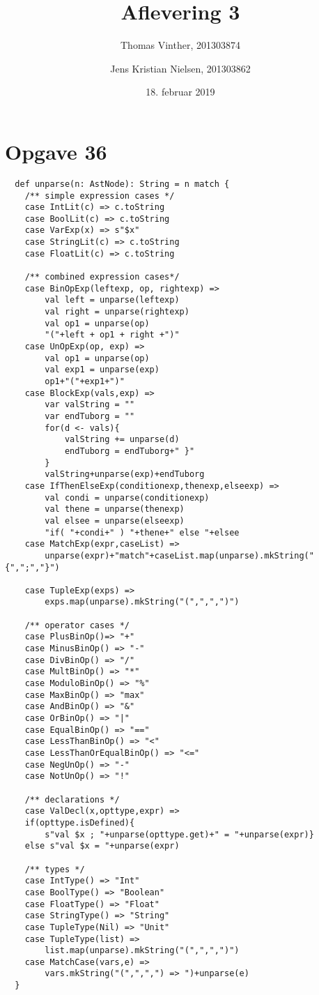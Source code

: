\documentclass[a4paper, 10pt]{article}
\title{Aflevering 3}
\author{Thomas Vinther, 201303874 \and Jens Kristian Nielsen, 201303862}
\date{18. februar 2019}
\begin{document}
\maketitle
\section*{Opgave 36}
\begin{lstlisting}
  def unparse(n: AstNode): String = n match {
  	/** simple expression cases */
  	case IntLit(c) => c.toString
  	case BoolLit(c) => c.toString
  	case VarExp(x) => s"$x"
  	case StringLit(c) => c.toString
  	case FloatLit(c) => c.toString
  	
  	/** combined expression cases*/
  	case BinOpExp(leftexp, op, rightexp) =>
  		val left = unparse(leftexp)
  		val right = unparse(rightexp)
  		val op1 = unparse(op)
  		"("+left + op1 + right +")"
  	case UnOpExp(op, exp) =>
  		val op1 = unparse(op)
  		val exp1 = unparse(exp)
  		op1+"("+exp1+")"
  	case BlockExp(vals,exp) =>
  		var valString = ""
  		var endTuborg = ""
  		for(d <- vals){
  			valString += unparse(d)
  			endTuborg = endTuborg+" }"
  		}
  		valString+unparse(exp)+endTuborg
  	case IfThenElseExp(conditionexp,thenexp,elseexp) =>
  		val condi = unparse(conditionexp)
	  	val thene = unparse(thenexp)
  		val elsee = unparse(elseexp)
	  	"if( "+condi+" ) "+thene+" else "+elsee
  	case MatchExp(expr,caseList) =>
  		unparse(expr)+"match"+caseList.map(unparse).mkString("{",";","}")
  	
  	case TupleExp(exps) =>
  		exps.map(unparse).mkString("(",",",")")
  	
  	/** operator cases */
  	case PlusBinOp()=> "+"
  	case MinusBinOp() => "-"
  	case DivBinOp() => "/"
  	case MultBinOp() => "*"
  	case ModuloBinOp() => "%"
  	case MaxBinOp() => "max"
  	case AndBinOp() => "&"
  	case OrBinOp() => "|"
  	case EqualBinOp() => "=="
  	case LessThanBinOp() => "<"
  	case LessThanOrEqualBinOp() => "<="
  	case NegUnOp() => "-"
  	case NotUnOp() => "!"
  	
  	/** declarations */
  	case ValDecl(x,opttype,expr) =>
  	if(opttype.isDefined){
  		s"val $x ; "+unparse(opttype.get)+" = "+unparse(expr)}
  	else s"val $x = "+unparse(expr)
  	
  	/** types */
  	case IntType() => "Int"
  	case BoolType() => "Boolean"
  	case FloatType() => "Float"
  	case StringType() => "String"
  	case TupleType(Nil) => "Unit"
  	case TupleType(list) =>
  		list.map(unparse).mkString("(",",",")")
  	case MatchCase(vars,e) =>
  		vars.mkString("(",",",") => ")+unparse(e)
  }
\end{lstlisting}
\end{document}
